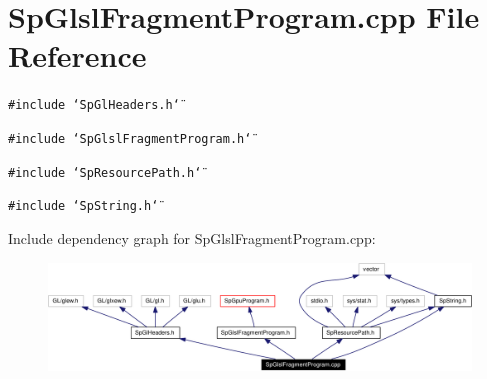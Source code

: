 \section{Sp\-Glsl\-Fragment\-Program.cpp File Reference}
\label{SpGlslFragmentProgram_8cpp}
{\tt \#include \char`\"{}Sp\-Gl\-Headers.h\char`\"{}}\par
{\tt \#include \char`\"{}Sp\-Glsl\-Fragment\-Program.h\char`\"{}}\par
{\tt \#include \char`\"{}Sp\-Resource\-Path.h\char`\"{}}\par
{\tt \#include \char`\"{}Sp\-String.h\char`\"{}}\par


Include dependency graph for Sp\-Glsl\-Fragment\-Program.cpp:\begin{figure}[H]
\begin{center}
\leavevmode
\includegraphics[width=387pt]{SpGlslFragmentProgram_8cpp__incl}
\end{center}
\end{figure}
